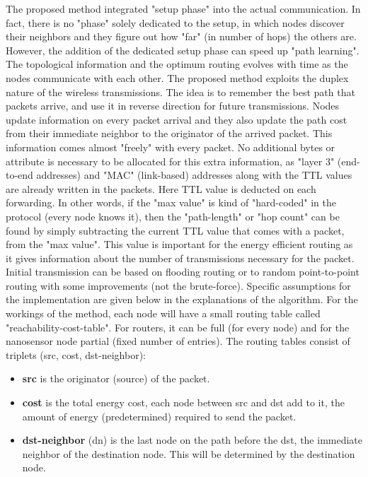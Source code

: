 \documentclass[12pt, oneandhalf, chaparabic, sees, ms]{metu}
\begin{document}
The proposed method integrated "setup phase" into the actual communication. In fact, there is no "phase" solely dedicated to the setup, 
in which nodes discover their neighbors and they figure out how "far" (in number of hops) the others are.
However, the addition of the dedicated setup phase can speed up "path learning".
The topological information and the optimum routing evolves with time as the nodes communicate with each other. The proposed method exploits 
the duplex nature of the wireless transmissions. The idea is to remember the best path that packets arrive, and use it in reverse direction
for future transmissions.
Nodes update information on every packet arrival and they also update the path cost from their immediate neighbor to the originator of the arrived packet.  
This information comes almost "freely" with every packet. No additional bytes or attribute is
necessary to be allocated for this extra information, as "layer 3" (end-to-end addresses) and "MAC" (link-based) addresses along with the 
TTL values are already written in the packets. Here TTL value is deducted on each forwarding. In other words, if the "max value" is kind 
of "hard-coded" in the protocol (every node knows it), then the "path-length" or "hop count" can be found by simply subtracting the current 
TTL value that comes with a packet, from the "max value". This value is important for the energy efficient routing as it gives information 
about the number of transmissions necessary for the packet.
Initial transmission can be based on flooding routing or to random point-to-point routing with some improvements (not the brute-force).
Specific assumptions for the implementation are given below in the explanations of the algorithm.
For the workings of the method, each node will have a small routing table called "reachability-cost-table". For routers, it can be full 
(for every node) and for the nanosensor node partial (fixed number of entries).
\newpage
The routing tables consist of triplets (src, cost, dst-neighbor):
\begin{itemize}
\item \textbf{src} is the originator (source) of the packet.
\item \textbf{cost} is the total energy cost, each node between src and dst add to it, the amount of energy (predetermined) required to send the packet.  
\item  \textbf{dst-neighbor} (dn) is the last node on the path before the dst, the immediate neighbor of the destination node. This will be determined by the destination node. 
\end{itemize}
\end{document}
